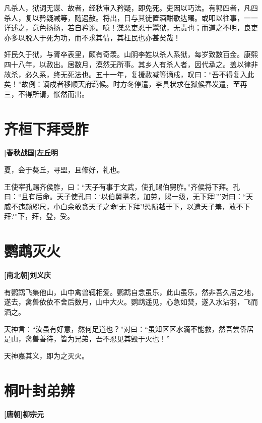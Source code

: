 \documentclass[UTF8,titlepage,oneside]{ctexbook}
\begin{document}
凡杀人，狱词无谋、故者，经秋审入矜疑，即免死。吏因以巧法。有郭四者，凡四杀人，复以矜疑减等，随遇赦。将出，日与其徒置酒酣歌达曙。或叩以往事，一一详述之，意色扬扬，若自矜诩。噫！渫恶吏忍于鬻狱，无责也；而道之不明，良吏亦多以脱人于死为功，而不求其情，其枉民也亦甚矣哉！

奸民久于狱，与胥卒表里，颇有奇羡。山阴李姓以杀人系狱，每岁致数百金。康熙四十八年，以赦出。居数月，漠然无所事。其乡人有杀人者，因代承之。盖以律非故杀，必久系，终无死法也。五十一年，复援赦减等谪戍，叹曰：“吾不得复入此矣！”故例：谪戍者移顺天府羁候。时方冬停遣，李具状求在狱候春发遣，至再三，不得所请，怅然而出。


\chapter*{齐桓下拜受胙}
\begin{center}
	\textbf{[春秋战国]左丘明}
\end{center}


夏，会于葵丘，寻盟，且修好，礼也。


王使宰孔赐齐侯胙，曰：“天子有事于文武，使孔赐伯舅胙。”齐侯将下拜。孔曰：“且有后命。天子使孔曰：‘以伯舅耋老，加劳，赐一级，无下拜!”’对曰：“天威不违颜咫尺，小白余敢贪天子之命‘无下拜’!恐陨越于下，以遗天子羞，敢不下拜?”下，拜，登，受。



\chapter*{鹦鹉灭火}
\begin{center}
	\textbf{[南北朝]刘义庆}
\end{center}

有鹦鹉飞集他山，山中禽兽辄相爱。鹦鹉自念虽乐，此山虽乐，然非吾久居之地，遂去，禽兽依依不舍后数月，山中大火。鹦鹉遥见，心急如焚，遂入水沾羽，飞而洒之。

天神言：“汝虽有好意，然何足道也？”对曰：“虽知区区水滴不能救，然吾尝侨居是山，禽兽善待，皆为兄弟，吾不忍见其毁于火也！”

天神嘉其义，即为之灭火。


\chapter*{桐叶封弟辨}
\begin{center}
	\textbf{[唐朝]柳宗元}
\end{center}
\end{document}
